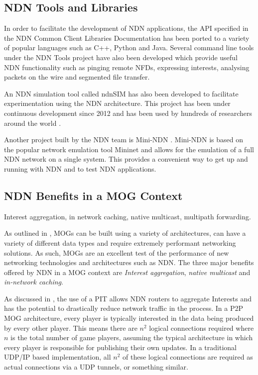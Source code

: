 \subsection{NDN Tools and Libraries}\label{sec:ndn-tools}
In order to facilitate the development of NDN applications, the API specified in the NDN Common Client Libraries Documentation \cite{ndn-ccl} has been ported to a variety of popular languages such as C++, Python and Java. Several command line tools under the NDN Tools project \cite{ndn-tools} have also been developed which provide useful NDN functionality such as pinging remote NFDs, expressing interests, analysing packets on the wire and segmented file transfer.

An NDN simulation tool called ndnSIM \cite{ndn-sim-webpage} has also been developed to facilitate experimentation using the NDN architecture. This project has been under continuous development since 2012 and has been used by hundreds of researchers around the world \cite{ndnsim}.  

Another project built by the NDN team is Mini-NDN \cite{mini-ndn}. Mini-NDN is based on the popular network emulation tool Mininet \cite{mininet} and allows for the emulation of a full NDN network on a single system. This provides a convenient way to get up and running with NDN and to test NDN applications.





\subsection{NDN Benefits in a MOG Context}
Interest aggregation, in network caching, native multicast, multipath forwarding.

As outlined in , MOGs can be built using a variety of architectures, can have a variety of different data types and require extremely performant networking solutions. As such, MOGs are an excellent test of the performance of new networking technologies and architectures such as NDN. The three major benefits offered by NDN in a MOG context are \textit{Interest aggregation}, \textit{native multicast} and \textit{in-network caching}.

As discussed in , the use of a PIT allows NDN routers to aggregate Interests and has the potential to drastically reduce network traffic in the process. In a P2P MOG architecture, every player is typically interested in the data being produced by every other player. This means there are $n^2$ logical connections required where $n$ is the total number of game players, assuming the typical architecture in which every player is responsible for publishing their own updates. In a traditional UDP/IP based implementation, all $n^2$ of these logical connections are required as actual connections via a UDP tunnels, or something similar.

